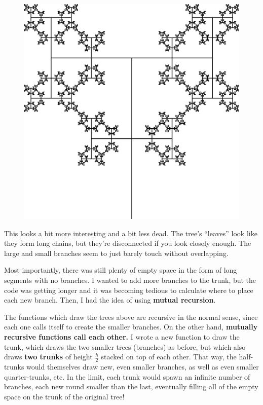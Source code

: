 \documentclass{article}
\begin{document}
\begin{figure}[H]
  \centering
  \includegraphics[scale=0.125]{quaternary_tree.png}
\end{figure}
This looks a bit more interesting and a bit less dead.
The tree's ``leaves'' look like they form long chains,
but they're disconnected if you look closely enough.
The large and small branches seem to just barely touch without overlapping.

Most importantly, there was still plenty of empty space
in the form of long segments with no branches.
I wanted to add more branches to the trunk,
but the code was getting longer
and it was becoming tedious to calculate where to place each new branch.
Then, I had the idea of using \textbf{mutual recursion}.

The functions which draw the trees above are recursive in the normal sense,
since each one calls itself to create the smaller branches.
On the other hand,
\textbf{mutually recursive functions call each other.}
I wrote a new function to draw the trunk,
which draws the two smaller trees (branches) as before,
but which also draws \textbf{two trunks} of height $\frac{h}{2}$
stacked on top of each other.
That way, the half-trunks
would themselves draw new, even smaller branches,
as well as even smaller quarter-trunks, etc.
In the limit, each trunk would spawn an infinite number of branches,
each new round smaller than the last,
eventually filling all of the empty space on the trunk of the original tree!
\end{document}
